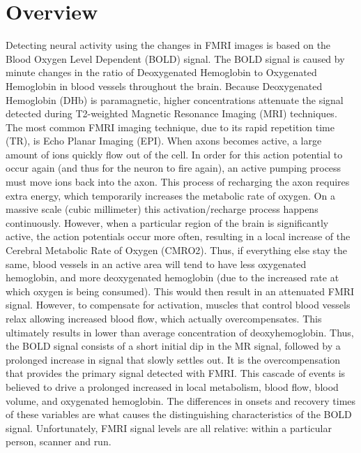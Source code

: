 \section{Overview}
\label{sec:Introduction Overview}
Detecting neural activity using the changes in FMRI images is based on 
the Blood Oxygen Level Dependent (BOLD) signal.
The BOLD signal is caused by minute changes in the ratio of Deoxygenated
Hemoglobin to Oxygenated Hemoglobin in blood vessels throughout the brain.
Because Deoxygenated Hemoglobin (DHb) is paramagnetic, higher concentrations
attenuate the signal detected during T2-weighted Magnetic Resonance Imaging (MRI)
techniques. The most common FMRI imaging technique, due to its rapid repetition 
time (TR), is Echo Planar Imaging (EPI). When axons becomes active,
a large amount of ions quickly flow out of the cell. In order for this
action potential to occur again (and thus for the neuron to fire again),
an active pumping process must move ions back into the
axon. This process of recharging the axon requires extra energy, which temporarily
increases the metabolic rate of oxygen. On a massive scale (cubic millimeter) 
this activation/recharge process happens continuously. However, when a 
particular region of the brain is significantly active, the action potentials
occur more often, resulting in a local increase of the 
Cerebral Metabolic Rate of Oxygen (CMRO2). Thus, if everything else 
stay the same, blood vessels in an active area will 
tend to have less oxygenated hemoglobin, and more deoxygenated hemoglobin
(due to the increased rate at which oxygen is being consumed).
This would then result in an attenuated FMRI signal. However, to
compensate for activation, muscles that
control blood vessels relax allowing increased blood flow,
which actually overcompensates.
This ultimately results in lower than average concentration of 
deoxyhemoglobin. Thus, the BOLD signal consists of a short initial
dip in the MR signal, followed by a prolonged increase in signal
that slowly settles out. It is the overcompensation that provides
the  primary signal detected with FMRI. This cascade of events
is believed to drive a prolonged increased in local metabolism, 
blood flow, blood volume, and oxygenated hemoglobin. The differences
in onsets and recovery times of these variables are what causes the 
distinguishing characteristics of the BOLD signal. Unfortunately, 
FMRI signal levels are all relative: within a particular
person, scanner and run. 

